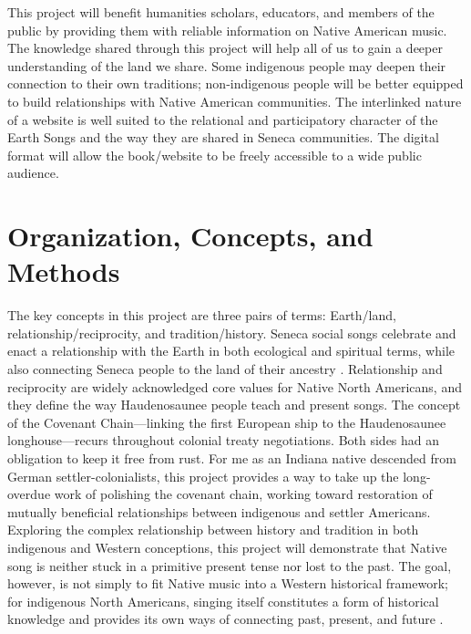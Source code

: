 \documentclass{neh}
\begin{document}
This project will benefit humanities scholars, educators, and members of the
public by providing them with reliable information on Native American
music.
The knowledge shared through this project will help all of us to gain a deeper
understanding of the land we share.
Some indigenous people may deepen their connection to their own traditions;
non-indigenous people will be better equipped to build relationships with
Native American communities.
The interlinked nature of a website is well suited to the relational and
participatory character of the Earth Songs and the way they are shared in
Seneca communities.
The digital format will allow the book/website to be freely 
accessible to a wide public audience.
\section{Organization, Concepts, and Methods}
The key concepts in this project are three pairs of terms: Earth/land,
relationship/reciprocity, and tradition/history.
Seneca social songs celebrate and enact a relationship with the Earth in both
ecological and spiritual terms, while also connecting Seneca people to the
land of their ancestry
\Autocites{Deloria:BrokenTreaties}{BasicCall}.
Relationship and reciprocity are widely acknowledged core values for Native
North Americans, and they define the way Haudenosaunee people teach and
present songs.
The concept of the Covenant Chain---linking the first European ship to the
Haudenosaunee longhouse---recurs throughout colonial treaty negotiations.
Both sides had an obligation to keep it free from rust.
For me as an Indiana native descended from German settler-colonialists, this
project provides a way to take up the long-overdue work of polishing the
covenant chain, working toward restoration of mutually beneficial
relationships between indigenous and settler Americans. 
Exploring the complex relationship between history and tradition in both
indigenous and Western conceptions, this project will demonstrate that 
Native song is neither stuck in a primitive present tense nor lost to the past.
The goal, however, is not simply to fit Native music into a Western historical
framework; 
for indigenous North Americans, singing itself constitutes a form of
historical knowledge and provides its own ways of connecting past, present,
and future
\Autocite{Diamond:NativeAmericanHistory}.
\end{document}
